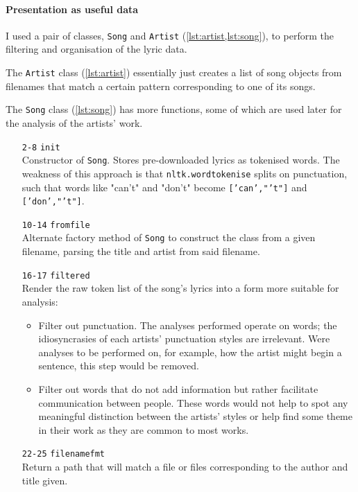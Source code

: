 \paragraph{Presentation as useful data}

I used a pair of classes, \texttt{Song} and \texttt{Artist} (\cref{lst:artist,lst:song}), to perform the filtering and organisation of the lyric data.


The \texttt{Artist} class (\cref{lst:artist}) essentially just creates a list of song objects from filenames that match a certain pattern corresponding to one of its songs.

The \texttt{Song} class (\cref{lst:song}) has more functions, some of which are used later for the analysis of the artists' work.
\begin{itemize}
	\item[\texttt{2-8}] \texttt{\textunderscore \textunderscore init\textunderscore \textunderscore }\\ Constructor of \texttt{Song}. Stores pre-downloaded lyrics as tokenised words. The weakness of this approach is that \texttt{\texttt{nltk.word\textunderscore tokenise}} splits on punctuation, such that words like "can't" and "don't" become \texttt{['can',"'t"]} and \texttt{['don',"'t"]}.
	\item[\texttt{10-14}] \texttt{from\textunderscore file}\\
	Alternate factory method of \texttt{Song} to construct the class from  a given filename, parsing the title and artist from said filename.
	\item[\texttt{16-17}] \texttt{filtered}\\
	Render the raw token list of the song's lyrics into a form more suitable for analysis:
	\begin{itemize}
		\item Filter out punctuation. The analyses performed operate on words; the idiosyncrasies of each artists' punctuation styles are irrelevant. Were analyses to be performed on, for example, how the artist might begin a sentence, this step would be removed.
		\item Filter out words that do not add information but rather facilitate communication between people. These words would not help to spot any meaningful distinction between the artists' styles or help find some theme in their work as they are common to most works.
	\end{itemize}
	\item[\texttt{22-25}] \texttt{filename\textunderscore fmt}\\
	Return a path that will match a file or files corresponding to the author and title given.
\end{itemize}

